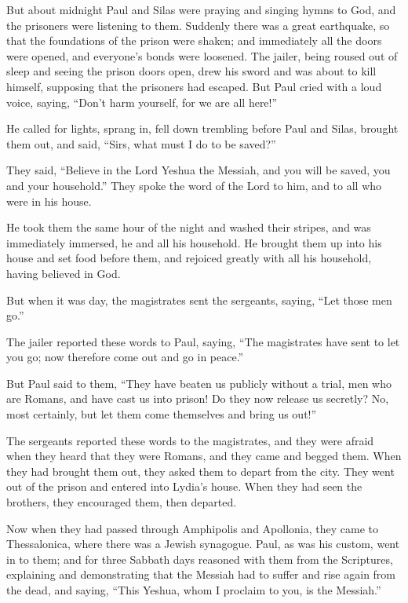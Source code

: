 \myverse{}But about midnight Paul and Silas were praying and singing hymns
to God, and the prisoners were listening to them.
\myverse{}Suddenly there was a great earthquake, so that the foundations of the prison
were shaken; and immediately all the doors were opened, and everyone’s bonds were loosened.
\myverse{}The jailer, being roused out of sleep and seeing the prison doors open, drew
his sword and was about to kill himself, supposing that the prisoners had escaped.
\myverse{}But Paul cried with a loud voice, saying, “Don’t harm yourself, for we are
all here!”

\myverse{}He called for lights, sprang in, fell down trembling before
Paul and Silas,
\myverse{}brought them out, and said, “Sirs, what must I do to be saved?”

\myverse{}They said, “Believe in the Lord Yeshua the Messiah, and you
will be saved, you and your household.”
\myverse{}They spoke the word of the Lord to him, and to all who were in his house.

\myverse{}He took them the same hour of the night and washed their stripes,
and was immediately immersed, he and all his household.
\myverse{}He brought them up into his house and set food before them, and rejoiced
greatly with all his household, having believed in God.

\myverse{}But when it was day, the magistrates sent the sergeants, saying,
“Let those men go.”

\myverse{}The jailer reported these words to Paul, saying, “The magistrates
have sent to let you go; now therefore come out and go in peace.”

\myverse{}But Paul said to them, “They have beaten us publicly without
a trial, men who are Romans, and have cast us into prison! Do they now release us secretly? No, most certainly,
but let them come themselves and bring us out!”

\myverse{}The sergeants reported these words to the magistrates, and they
were afraid when they heard that they were Romans,
\myverse{}and they came and begged them. When they had brought them out, they asked
them to depart from the city.
\myverse{}They went out of the prison and entered into Lydia’s house. When they had
seen the brothers, they encouraged them, then departed.


\mychapter{} \myverse*{}Now when they had passed through Amphipolis and Apollonia, they
came to Thessalonica, where there was a Jewish synagogue.
\myverse{}Paul, as was his custom, went in to them; and for three Sabbath days reasoned
with them from the Scriptures,
\myverse{}explaining and demonstrating that the Messiah had to suffer and rise again
from the dead, and saying, “This Yeshua, whom I proclaim to you, is the Messiah.”


